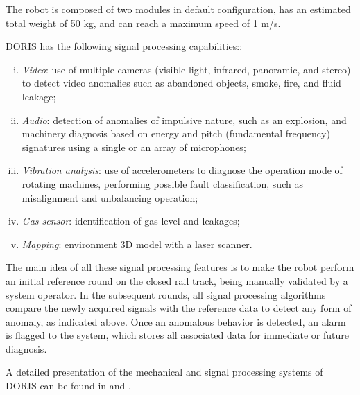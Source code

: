 \documentclass{ifacconf}
\begin{document}

The robot is composed of two modules in default configuration, has an estimated
total weight of 50 kg, and can reach a maximum speed of 1 m/s.

DORIS has the following signal processing capabilities::
\begin{enumerate}[i)]
  \item \emph{Video}: use
of multiple cameras (visible-light, infrared, panoramic, and stereo) to detect
video anomalies such as abandoned objects, smoke, fire, and fluid leakage;
  \item \emph{Audio}: detection of anomalies of impulsive nature, such as
an explosion, and machinery diagnosis based on energy and pitch
(fundamental frequency) signatures using a single or an array of microphones;
  \item \emph{Vibration analysis}: use of accelerometers to diagnose the operation mode
of rotating machines, performing possible fault classification, such as
 misalignment and unbalancing operation;
  \item \emph{Gas sensor}: identification of gas level and leakages;
  \item \emph{Mapping}: environment 3D model with a laser scanner.
\end{enumerate}

The main idea of all these signal processing features is to make the robot
perform an initial reference round on the closed rail track, being manually
validated by a system operator. In the subsequent rounds, all signal processing
algorithms compare the newly acquired signals with the reference data to detect
any form of anomaly, as indicated above. Once an anomalous behavior is
detected, an alarm is flagged to the system, which stores all associated data
for immediate or future diagnosis.

A detailed presentation of the mechanical and signal processing systems of
DORIS can be found in \cite{OTC} and \cite{cba}.
\end{document}
